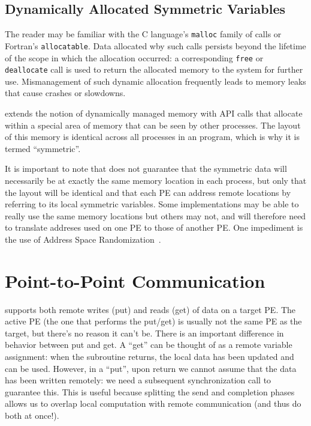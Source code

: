 \subsection{Dynamically Allocated Symmetric Variables}

The reader may be familiar with the C language's \texttt{malloc}
family of calls or Fortran's \texttt{allocatable}.  Data allocated wby
such calls persists beyond the lifetime of the scope in which the
allocation occurred: a corresponding \texttt{free} or
\texttt{deallocate} call is used to return the allocated memory to the
system for further use.  Mismanagement of such dynamic allocation
frequently leads to memory leaks that cause crashes or slowdowns.

\openshmem extends the notion of dynamically managed memory with API
calls that allocate within a special area of memory that can be seen
by other processes.  The layout of this memory is identical across all
processes in an \openshmem program, which is why it is termed
``symmetric''.

It is important to note that \openshmem does not guarantee that the
symmetric data will necessarily be at exactly the same memory location
in each process, but only that the layout will be identical and that
each PE can address remote locations by referring to its local
symmetric variables.  Some implementations may be able to really use
the same memory locations but others may not, and will therefore need
to translate addreses used on one PE to those of another PE.  One
impediment is the use of Address Space Randomization~\cite{ASLR}.



\section{Point-to-Point Communication}

\openshmem supports both remote writes (put) and reads (get) of data
on a target PE.  The active PE (the one that performs the put/get) is
usually not the same PE as the target, but there's no reason it can't
be.  There is an important difference in behavior between put and get.
A ``get'' can be thought of as a remote variable assignment: when the
subroutine returns, the local data has been updated and can be used.
However, in a ``put'', upon return we cannot assume that the data has
been written remotely: we need a subsequent synchronization call to
guarantee this.  This is useful because splitting the send and
completion phases allows us to overlap local computation with remote
communication (and thus do both at once!).

